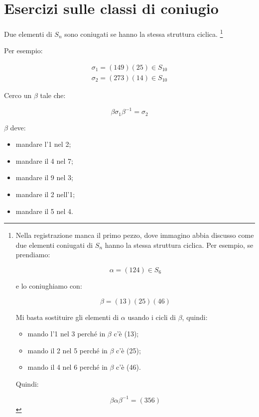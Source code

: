 \chapter{Esercizi sulle classi di coniugio}

\begin{corollario}
	Due elementi di $S_n$ sono coniugati se hanno la stessa struttura ciclica.
	\footnote{Nella registrazione \cite[13 ottobre 2021]{lucchini} manca il primo pezzo, dove immagino abbia discusso come due elementi coniugati di $S_n$ hanno la stessa struttura ciclica. Per esempio, se prendiamo:
	
		\begin{equation}
			\alpha = (124) \in S_6
		\end{equation}

	e lo coniughiamo con:
	
	\begin{equation}
		\beta = (13)(25)(46)
	\end{equation} 

	Mi basta sostituire gli elementi di $\alpha$ usando i cicli di $\beta$, quindi:
	
	\begin{itemize}
		\item mando l'1 nel 3 perché in $\beta$ c'è (13);
		\item mando il 2 nel 5 perché in $\beta$ c'è (25);
		\item mando il 4 nel 6 perché in $\beta$ c'è (46).
	\end{itemize}

	Quindi:
	
	\begin{equation}
		\beta \alpha \beta^{-1} = (356)
	\end{equation}
	}
\end{corollario}

Per esempio:

\begin{gather}
	\sigma_1 = (149)(25) \in S_{10} \\
	\sigma_2 = (273)(14) \in S_{10}
\end{gather}

Cerco un $\beta$ tale che:

\begin{equation}
	\beta \sigma_1 \beta^{-1} = \sigma_2
\end{equation}

$\beta$ deve:
\begin{itemize}
	\item mandare l'1 nel 2;
	\item mandare il 4 nel 7;
	\item mandare il 9 nel 3;
	\item mandare il 2 nell'1;
	\item mandare il 5 nel 4.
\end{itemize}

